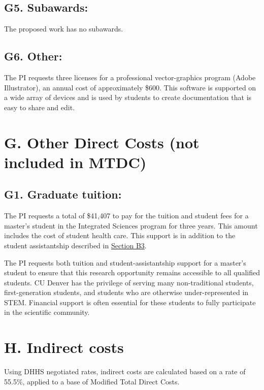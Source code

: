 \documentclass[11pt,oneside]{memoir}
\begin{document}
\subsection*{G5. Subawards:}
The proposed work has no subawards.

\subsection*{G6. Other:}

The PI requests three licenses for a professional vector-graphics program (Adobe Illustrator), an annual cost of approximately \$600. This software is supported on a wide array of devices and is used by students to create documentation that is easy to share and edit.


\section*{G. Other Direct Costs (not included in MTDC)}
%

\subsection{G1. Graduate tuition:}
The PI requests a total of \$41,407 to pay for the tuition and student fees for a master's student in the Integrated Sciences program for three years.  This amount includes the cost of student health care. This support is in addition to the student assistantship described in 
\hyperref[sec:masters-student-salary]{Section B3}.

The PI requests both tuition and student-assistantship support for a master's student to ensure that this research opportunity remains accessible to all qualified students.  CU Denver has the privilege of serving many non-traditional students, first-generation students, and students who are otherwise under-represented in STEM.  Financial support is often essential for these students to fully participate in the scientific community.

\section*{H. Indirect costs} 

Using DHHS negotiated rates, indirect costs are calculated based on a rate of 55.5\%, applied to a base of Modified Total Direct Costs. 
\end{document}
